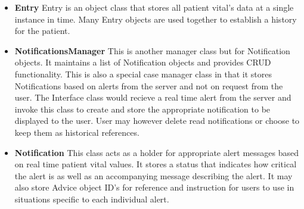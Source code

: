 \begin{itemize}
  	\item \textbf{Entry}
	Entry is an object class that stores all patient vital's data at a single instance in time. Many Entry objects are used together to establish a history for the patient. 
  	\item \textbf{NotificationsManager}
	This is another manager class but for Notification objects. It maintains a list of Notification objects and provides CRUD functionality. This is also a special case manager class in that it stores Notifications based on alerts from the server and not on request from the user. The Interface class would recieve a real time alert from the server and invoke this class to create and store the appropriate notification to be displayed to the user. User may however delete read notifications or choose to keep them as historical references. 
  	\item \textbf{Notification}
	This class acts as a holder for appropriate alert messages based on real time patient vital values. It stores a status that indicates how critical the alert is as well as an accompanying message describing the alert. It may also store Advice object ID's for reference and instruction for users to use in situations specific to each individual alert.
\end{itemize}
